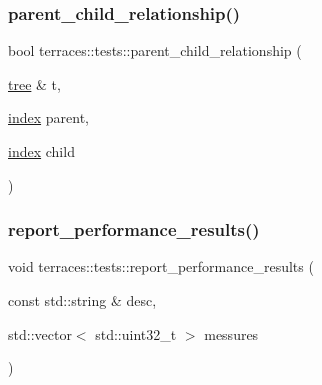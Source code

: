 \mbox{\label{namespaceterraces_1_1tests_a25ca9a3b46fb14ea14a41a5b863fc77a}} 
\subsubsection{\texorpdfstring{parent\+\_\+child\+\_\+relationship()}{parent\_child\_relationship()}}
{\footnotesize\ttfamily bool terraces\+::tests\+::parent\+\_\+child\+\_\+relationship (\begin{DoxyParamCaption}\item[{\hyperlink{namespaceterraces_a07aaf7feec4a22c6cdefc14c5a81bdd0}{tree} \&}]{t,  }\item[{\hyperlink{namespaceterraces_adbc33ccb543d1634e96d0eb02e472c77}{index}}]{parent,  }\item[{\hyperlink{namespaceterraces_adbc33ccb543d1634e96d0eb02e472c77}{index}}]{child }\end{DoxyParamCaption})}

\mbox{\label{namespaceterraces_1_1tests_a62c2bedb73f6a77050e4efc1ae854e78}} 
\subsubsection{\texorpdfstring{report\+\_\+performance\+\_\+results()}{report\_performance\_results()}}
{\footnotesize\ttfamily void terraces\+::tests\+::report\+\_\+performance\+\_\+results (\begin{DoxyParamCaption}\item[{const std\+::string \&}]{desc,  }\item[{std\+::vector$<$ std\+::uint32\+\_\+t $>$}]{messures }\end{DoxyParamCaption})\hspace{0.3cm}{\ttfamily [inline]}}

\mbox{\label{namespaceterraces_1_1tests_afdee18895870cc92e51399a34cce9b14}} 
